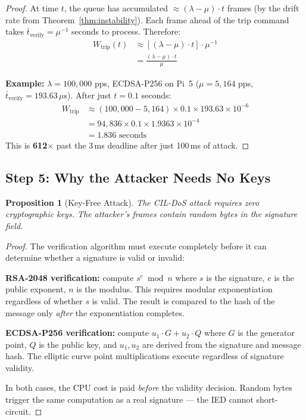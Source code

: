 \documentclass[11pt,a4paper,twocolumn]{article}
\newtheorem{proposition}{Proposition}
\begin{document}
\begin{proof}
At time $t$, the queue has accumulated $\approx (\lambda - \mu) \cdot t$ frames (by the drift rate from Theorem~\ref{thm:instability}). Each frame ahead of the trip command takes $\bar{t}_{\text{verify}} = \mu^{-1}$ seconds to process. Therefore:
\begin{align}
W_{\text{trip}}(t) &\approx [(\lambda - \mu) \cdot t] \cdot \mu^{-1} \\
&= \frac{(\lambda - \mu) \cdot t}{\mu}
\end{align}

\textbf{Example:} $\lambda = 100{,}000$ pps, ECDSA-P256 on Pi~5 ($\mu = 5{,}164$ pps, $\bar{t}_{\text{verify}} = 193.63\,\mu$s). After just $t = 0.1$ seconds:
\begin{align}
W_{\text{trip}} &\approx (100{,}000 - 5{,}164) \times 0.1 \times 193.63 \times 10^{-6} \\
&= 94{,}836 \times 0.1 \times 1.9363 \times 10^{-4} \\
&= 1.836 \text{ seconds}
\end{align}
This is \textbf{612$\times$} past the 3\,ms deadline after just 100\,ms of attack.
\end{proof}

\subsection{Step 5: Why the Attacker Needs No Keys}

\begin{proposition}[Key-Free Attack]
The CIL-DoS attack requires zero cryptographic keys. The attacker's frames contain random bytes in the signature field.
\end{proposition}

\begin{proof}
The verification algorithm must execute completely before it can determine whether a signature is valid or invalid:

\textbf{RSA-2048 verification:} compute $s^e \bmod n$ where $s$ is the signature, $e$ is the public exponent, $n$ is the modulus. This requires modular exponentiation regardless of whether $s$ is valid. The result is compared to the hash of the message only \emph{after} the exponentiation completes.

\textbf{ECDSA-P256 verification:} compute $u_1 \cdot G + u_2 \cdot Q$ where $G$ is the generator point, $Q$ is the public key, and $u_1, u_2$ are derived from the signature and message hash. The elliptic curve point multiplications execute regardless of signature validity.

In both cases, the CPU cost is paid \emph{before} the validity decision. Random bytes trigger the same computation as a real signature --- the IED cannot short-circuit.
\end{proof}
\end{document}
